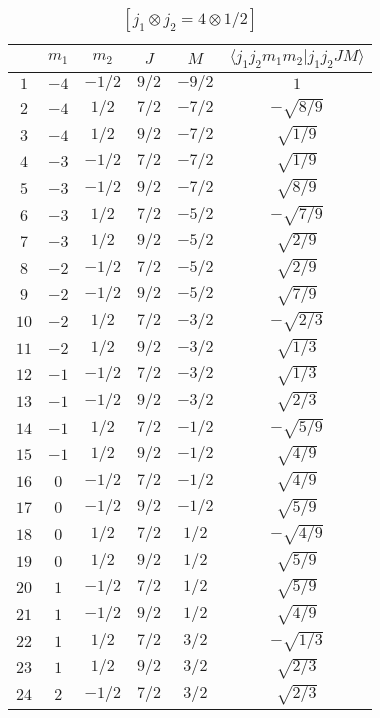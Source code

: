 \begin{table}
\tiny
\caption{$[j_1 \otimes j_2 = 4 \otimes 1/2]$}
\begin{center}
\begin{tabular}{|c|c|c|c|c|c|}
\hline 
   & $m_1$ & $m_2$ & $J$ & $M$ & $\langle j_1 j_2 m_1 m_2 | j_1 j_2 J M \rangle$ \\ 
\hline 
$1$ & $-4$ & $-1/2$ & $9/2$ & $-9/2$ & $1$ \\ 
$2$ & $-4$ & $1/2$ & $7/2$ & $-7/2$ & $-\sqrt{8/9}$ \\ 
$3$ & $-4$ & $1/2$ & $9/2$ & $-7/2$ & $\sqrt{1/9}$ \\ 
$4$ & $-3$ & $-1/2$ & $7/2$ & $-7/2$ & $\sqrt{1/9}$ \\ 
$5$ & $-3$ & $-1/2$ & $9/2$ & $-7/2$ & $\sqrt{8/9}$ \\ 
$6$ & $-3$ & $1/2$ & $7/2$ & $-5/2$ & $-\sqrt{7/9}$ \\ 
$7$ & $-3$ & $1/2$ & $9/2$ & $-5/2$ & $\sqrt{2/9}$ \\ 
$8$ & $-2$ & $-1/2$ & $7/2$ & $-5/2$ & $\sqrt{2/9}$ \\ 
$9$ & $-2$ & $-1/2$ & $9/2$ & $-5/2$ & $\sqrt{7/9}$ \\ 
$10$ & $-2$ & $1/2$ & $7/2$ & $-3/2$ & $-\sqrt{2/3}$ \\ 
$11$ & $-2$ & $1/2$ & $9/2$ & $-3/2$ & $\sqrt{1/3}$ \\ 
$12$ & $-1$ & $-1/2$ & $7/2$ & $-3/2$ & $\sqrt{1/3}$ \\ 
$13$ & $-1$ & $-1/2$ & $9/2$ & $-3/2$ & $\sqrt{2/3}$ \\ 
$14$ & $-1$ & $1/2$ & $7/2$ & $-1/2$ & $-\sqrt{5/9}$ \\ 
$15$ & $-1$ & $1/2$ & $9/2$ & $-1/2$ & $\sqrt{4/9}$ \\ 
$16$ & $0$ & $-1/2$ & $7/2$ & $-1/2$ & $\sqrt{4/9}$ \\ 
$17$ & $0$ & $-1/2$ & $9/2$ & $-1/2$ & $\sqrt{5/9}$ \\ 
$18$ & $0$ & $1/2$ & $7/2$ & $1/2$ & $-\sqrt{4/9}$ \\ 
$19$ & $0$ & $1/2$ & $9/2$ & $1/2$ & $\sqrt{5/9}$ \\ 
$20$ & $1$ & $-1/2$ & $7/2$ & $1/2$ & $\sqrt{5/9}$ \\ 
$21$ & $1$ & $-1/2$ & $9/2$ & $1/2$ & $\sqrt{4/9}$ \\ 
$22$ & $1$ & $1/2$ & $7/2$ & $3/2$ & $-\sqrt{1/3}$ \\ 
$23$ & $1$ & $1/2$ & $9/2$ & $3/2$ & $\sqrt{2/3}$ \\ 
$24$ & $2$ & $-1/2$ & $7/2$ & $3/2$ & $\sqrt{2/3}$ \\ 

\end{tabular}
\end{center}
\end{table}
